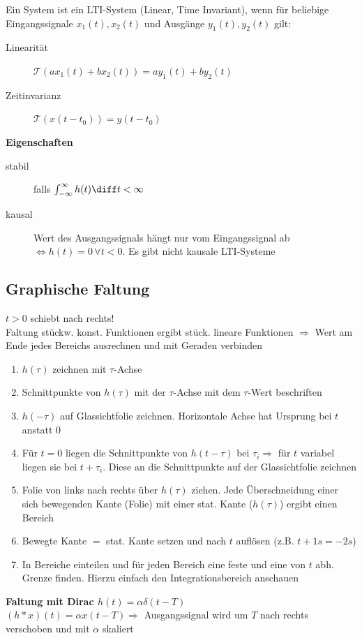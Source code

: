 Ein System ist ein LTI-System (Linear, Time Invariant), wenn für beliebige Eingangssignale $x_1(t), x_2(t)$ und Ausgänge $y_1(t), y_2(t)$ gilt:
\begin{description}
    \item[Linearität] $\mathcal{T}(ax_1(t) + bx_2(t)) = ay_1(t) + by_2(t)$
    \item[Zeitinvarianz] $\mathcal{T}(x(t-t_0))=y(t-t_0)$
\end{description}

\textbf{Eigenschaften}
\begin{description}
    \item[stabil] falls $\int_{-\infty}^\infty h(t)\diff t < \infty$
    \item[kausal] Wert des Ausgangssignals hängt nur vom Eingangssignal ab $\Leftrightarrow h(t)=0 \, \forall t<0$. Es gibt nicht kausale LTI-Systeme
\end{description}

\subsection{Graphische Faltung}
\begin{sectionbox}
    $t>0$ schiebt nach rechts! \\
    Faltung stückw. konst. Funktionen ergibt stück. lineare Funktionen $\Rightarrow$ Wert am Ende jedes Bereichs ausrechnen und mit Geraden verbinden
    \begin{enumerate}
        \item $h(\tau)$ zeichnen mit $\tau$-Achse
        \item Schnittpunkte von $h(\tau)$ mit der $\tau$-Achse mit dem $\tau$-Wert beschriften
        \item $h(-\tau)$ auf Glassichtfolie zeichnen. Horizontale Achse hat Ursprung bei $t$ anstatt $0$
        \item Für $t=0$ liegen die Schnittpunkte von $h(t-\tau)$ bei $\tau_i \Rightarrow$ für $t$ variabel liegen sie bei $t+\tau_i$. Diese an die Schnittpunkte auf der Glassichtfolie zeichnen
        \item Folie von links nach rechts über $h(\tau)$ ziehen. Jede Überschneidung einer sich bewegenden Kante (Folie) mit einer stat. Kante ($h(\tau)$) ergibt einen Bereich
        \item Bewegte Kante $=$ stat. Kante setzen und nach $t$ auflösen (z.B. $t+1s=-2s$)
        \item In Bereiche einteilen und für jeden Bereich eine feste und eine von $t$ abh. Grenze finden. Hierzu einfach den Integrationsbereich anschauen
    \end{enumerate}

    \textbf{Faltung mit Dirac $h(t) = \alpha\delta(t - T)$} \\
    $(h * x)(t)=\alpha x(t-T) \Rightarrow$ Ausgangssignal wird um $T$ nach rechts verschoben und mit $\alpha$ skaliert
\end{sectionbox}

